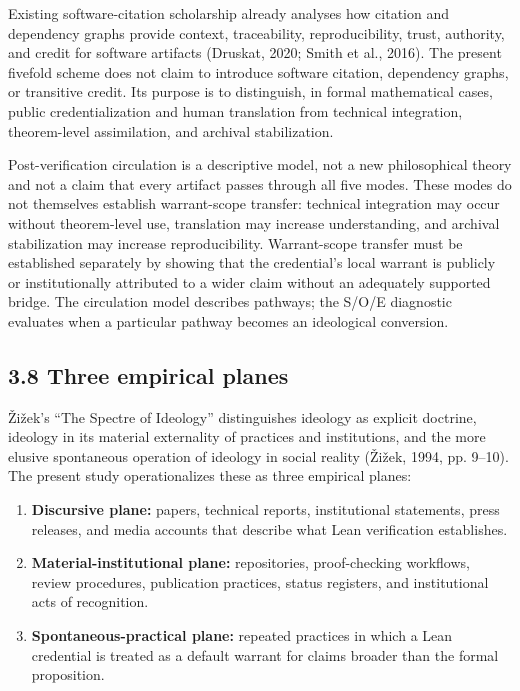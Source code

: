 \documentclass[sn-apa]{sn-jnl}
\begin{document}
Existing software-citation scholarship already analyses how citation and dependency graphs provide context, traceability, reproducibility, trust, authority, and credit for software artifacts (Druskat, 2020; Smith et al., 2016). The present fivefold scheme does not claim to introduce software citation, dependency graphs, or transitive credit. Its purpose is to distinguish, in formal mathematical cases, public credentialization and human translation from technical integration, theorem-level assimilation, and archival stabilization.

Post-verification circulation is a descriptive model, not a new philosophical theory and not a claim that every artifact passes through all five modes. These modes do not themselves establish warrant-scope transfer: technical integration may occur without theorem-level use, translation may increase understanding, and archival stabilization may increase reproducibility. Warrant-scope transfer must be established separately by showing that the credential's local warrant is publicly or institutionally attributed to a wider claim without an adequately supported bridge. The circulation model describes pathways; the S/O/E diagnostic evaluates when a particular pathway becomes an ideological conversion.

\subsection{3.8 Three empirical planes}

Žižek's “The Spectre of Ideology” distinguishes ideology as explicit doctrine, ideology in its material externality of practices and institutions, and the more elusive spontaneous operation of ideology in social reality (Žižek, 1994, pp. 9–10). The present study operationalizes these as three empirical planes:

\begin{enumerate}

\item \textbf{Discursive plane:} papers, technical reports, institutional statements, press releases, and media accounts that describe what Lean verification establishes.

\item \textbf{Material-institutional plane:} repositories, proof-checking workflows, review procedures, publication practices, status registers, and institutional acts of recognition.

\item \textbf{Spontaneous-practical plane:} repeated practices in which a Lean credential is treated as a default warrant for claims broader than the formal proposition.

\end{enumerate}
\end{document}
